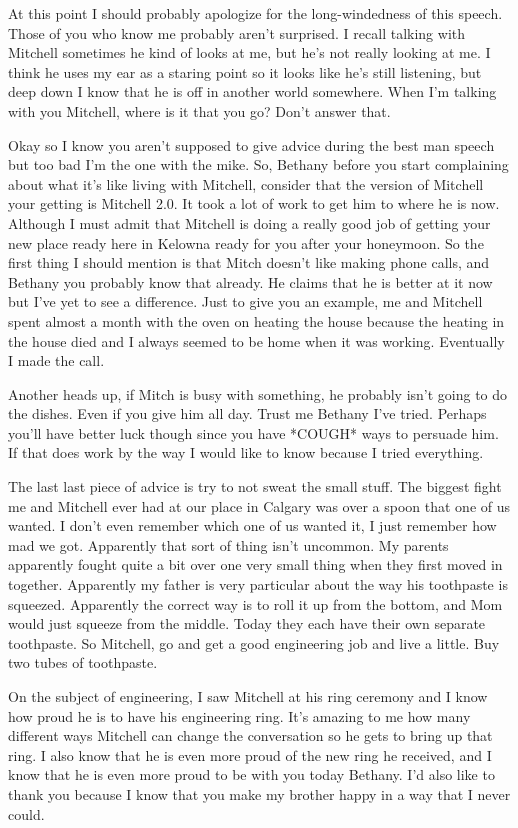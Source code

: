 At this point I should probably apologize for the long-windedness of this speech. Those of you who know me probably aren't surprised. I recall talking with Mitchell sometimes he kind of looks at me, but he's not really looking at me. I think he uses my ear as a staring point so it looks like he's still listening, but deep down I know that he is off in another world somewhere. When I'm talking with you Mitchell, where is it that you go? Don't answer that.

Okay so I know you aren't supposed to give advice during the best man speech but too bad I'm the one with the mike. So, Bethany before you start complaining about what it's like living with Mitchell, consider that the version of Mitchell your getting is Mitchell 2.0. It took a lot of work to get him to where he is now. Although I must admit that Mitchell is doing a really good job of getting your new place ready here in Kelowna ready for you after your honeymoon. So the first thing I should mention is that Mitch doesn't like making phone calls, and Bethany you probably know that already. He claims that he is better at it now but I've yet to see a difference. Just to give you an example, me and Mitchell spent almost a month with the oven on heating the house because the heating in the house died and I always seemed to be home when it was working. Eventually I made the call.

Another heads up, if Mitch is busy with something, he probably isn't going to do the dishes. Even if you give him all day. Trust me Bethany I've tried. Perhaps you'll have better luck though since you have *COUGH* ways to persuade him. If that does work by the way I would like to know because I tried everything.

The last last piece of advice is try to not sweat the small stuff. The biggest fight me and Mitchell ever had at our place in Calgary was over a spoon that one of us wanted. I don't even remember which one of us wanted it, I just remember how mad we got. Apparently that sort of thing isn't uncommon. My parents apparently fought quite a bit over one very small thing when they first moved in together. Apparently my father is very particular about the way his toothpaste is squeezed. Apparently the correct way is to roll it up from the bottom, and Mom would just squeeze from the middle. Today they each have their own separate toothpaste. So Mitchell, go and get a good engineering job and live a little. Buy two tubes of toothpaste.

On the subject of engineering, I saw Mitchell at his ring ceremony and I know how proud he is to have his engineering ring. It's amazing to me how many different ways Mitchell can change the conversation so he gets to bring up that ring. I also know that he is even more proud of the new ring he received, and I know that he is even more proud to be with you today Bethany. I'd also like to thank you because I know that you make my brother happy in a way that I never could.

